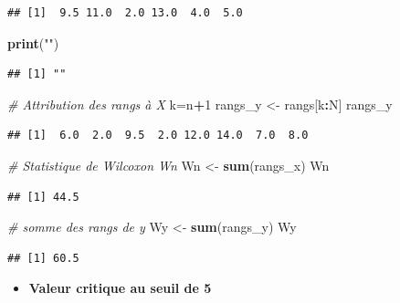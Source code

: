 \documentclass[
  12pt,
]{article}
\newenvironment{Shaded}{\begin{snugshade}}{\end{snugshade}}
\newcommand{\CommentTok}[1]{\textcolor[rgb]{0.56,0.35,0.01}{\textit{#1}}}
\newcommand{\DecValTok}[1]{\textcolor[rgb]{0.00,0.00,0.81}{#1}}
\newcommand{\FunctionTok}[1]{\textcolor[rgb]{0.13,0.29,0.53}{\textbf{#1}}}
\newcommand{\NormalTok}[1]{#1}
\newcommand{\OtherTok}[1]{\textcolor[rgb]{0.56,0.35,0.01}{#1}}
\newcommand{\SpecialCharTok}[1]{\textcolor[rgb]{0.81,0.36,0.00}{\textbf{#1}}}
\newcommand{\StringTok}[1]{\textcolor[rgb]{0.31,0.60,0.02}{#1}}
\providecommand{\tightlist}{%
  \setlength{\itemsep}{0pt}\setlength{\parskip}{0pt}}
\begin{document}
\begin{verbatim}
## [1]  9.5 11.0  2.0 13.0  4.0  5.0
\end{verbatim}

\begin{Shaded}
\begin{Highlighting}[]
\FunctionTok{print}\NormalTok{(}\StringTok{""}\NormalTok{)}
\end{Highlighting}
\end{Shaded}

\begin{verbatim}
## [1] ""
\end{verbatim}

\begin{Shaded}
\begin{Highlighting}[]
\CommentTok{\# Attribution des rangs à X}
\NormalTok{k}\OtherTok{=}\NormalTok{n}\SpecialCharTok{+}\DecValTok{1}
\NormalTok{rangs\_y }\OtherTok{\textless{}{-}}\NormalTok{ rangs[k}\SpecialCharTok{:}\NormalTok{N]}
\NormalTok{rangs\_y}
\end{Highlighting}
\end{Shaded}

\begin{verbatim}
## [1]  6.0  2.0  9.5  2.0 12.0 14.0  7.0  8.0
\end{verbatim}

\begin{Shaded}
\begin{Highlighting}[]
\CommentTok{\# Statistique de Wilcoxon Wn}
\NormalTok{Wn }\OtherTok{\textless{}{-}} \FunctionTok{sum}\NormalTok{(rangs\_x)}
\NormalTok{Wn}
\end{Highlighting}
\end{Shaded}

\begin{verbatim}
## [1] 44.5
\end{verbatim}

\begin{Shaded}
\begin{Highlighting}[]
\CommentTok{\# somme des rangs de y}
\NormalTok{Wy }\OtherTok{\textless{}{-}} \FunctionTok{sum}\NormalTok{(rangs\_y)}
\NormalTok{Wy}
\end{Highlighting}
\end{Shaded}

\begin{verbatim}
## [1] 60.5
\end{verbatim}

\begin{itemize}
\tightlist
\item
  \textbf{Valeur critique au seuil de 5}
\end{itemize}
\end{document}
